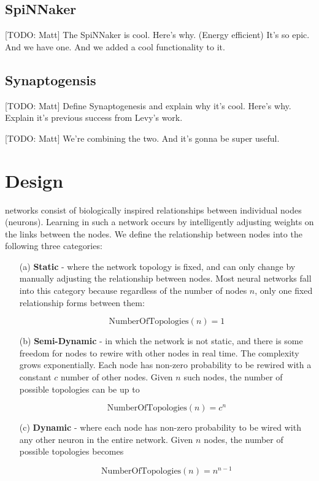 \documentclass[journal]{./sty/IEEEtran}
\begin{document}
\subsection{SpiNNaker}
[TODO: Matt]
The SpiNNaker is cool. 
Here's why. (Energy efficient)
It's so epic. 
And we have one. 
And we added a cool functionality to it. 

\subsection{Synaptogensis}
[TODO: Matt]
Define Synaptogenesis and explain why it's cool.
Here's why. 
Explain it's previous success from Levy's work.

\hfill

[TODO: Matt] We're combining the two. And it's gonna be super useful.


\section{Design}
 networks consist of biologically inspired relationships between individual nodes (neurons). Learning in such a network occurs by intelligently adjusting weights on the links between the nodes. We define the relationship between nodes into the following three categories:

\begin{itemize}
\item[(a)] {\bf Static} - where the network topology is fixed, and can only change by manually adjusting the relationship between nodes. Most neural networks fall into this category because regardless of the number of nodes \(n\), only one fixed relationship forms between them:

\[
\text{NumberOfTopologies}(n) = 1
\]


\item[(b)] {\bf Semi-Dynamic} - in which the network is not static, and there is some freedom for nodes to rewire with other nodes in real time. The complexity grows exponentially. Each node has non-zero probability to be rewired with a constant \(c\) number of other nodes. Given \(n\) such nodes, the number of possible topologies can be up to

\[
\text{NumberOfTopologies}(n) = c^n
\]


\item[(c)] {\bf Dynamic} - where each node has non-zero probability to be wired with any other neuron in the entire network. Given \(n\) nodes, the number of possible topologies becomes

\[
\text{NumberOfTopologies}(n) = n^{n-1}
\]


\end{itemize}
\end{document}
